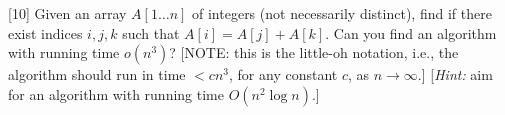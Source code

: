\documentclass[addpoints]{exam}
\begin{document}
\begin{questions}
[10]
Given an array $A[1 \dots n]$ of integers (not necessarily distinct), find if there exist indices $i, j, k$ such that $A[i] = A[j]+A[k]$.  Can you find an algorithm with running time $o(n^3)$? [NOTE: this is the little-oh notation, i.e., the algorithm should run in time $< cn^3$, for any constant $c$, as $n \rightarrow \infty$.] [{\em Hint:} aim for an algorithm with running time $O(n^2 \log n)$.]

\end{questions}
\end{document}
